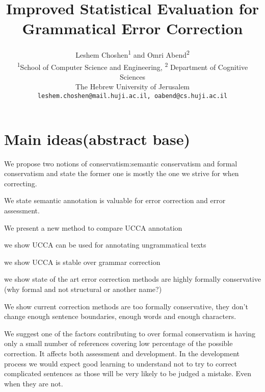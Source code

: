 \documentclass[11pt]{article}
\begin{document}
\title{Improved Statistical Evaluation for Grammatical Error Correction}

\author{
  Leshem Choshen\textsuperscript{1} and Omri Abend\textsuperscript{2} \\
  \textsuperscript{1}School of Computer Science and Engineering, \textsuperscript{2} Department of Cognitive Sciences \\
  The Hebrew University of Jerusalem \\
  \texttt{leshem.choshen@mail.huji.ac.il, oabend@cs.huji.ac.il}\\
}


\maketitle





\section{Main ideas(abstract base)}

We propose two notions of conservatism:semantic conservatism and formal
conservatism and state the former one is mostly the one we strive
for when correcting.

We state semantic annotation is valuable for error correction and
error assessment.

We present a new method to compare UCCA annotation

we show UCCA can be used for annotating ungrammatical texts

we show UCCA is stable over grammar correction

we show state of the art error correction methods are highly formally
conservative (why formal and not structural or another name?)

We show current correction methods are too formally conservative,
they don't change enough sentence boundaries, enough words and enough
characters.

We suggest one of the factors contributing to over formal conservatism
is having only a small number of references covering low percentage
of the possible correction. It affects both assessment and development.
In the development process we would expect good learning to understand
not to try to correct complicated sentences as those will be very
likely to be judged a mistake. Even when they are not.
\end{document}
